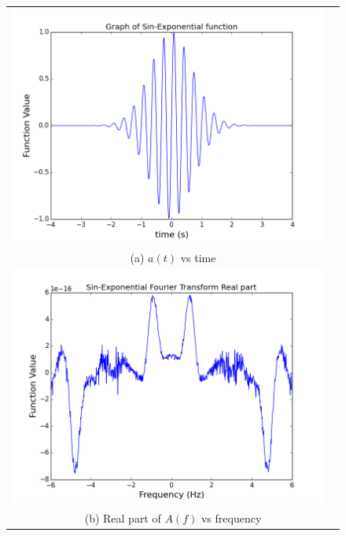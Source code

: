 \documentclass[11pt]{article}
\begin{document}
\begin{figure}[ht]
\centering
\begin{tabular}{cc}
\includegraphics[scale=.4]{sin_wavepacket.png} \\
\multicolumn{2}{c}{(a) $a(t)$ vs time} \\[6pt]

\includegraphics[scale=.4]{sin_fourReal.png}\\
\multicolumn{2}{c}{(b) Real part of $A(f)$ vs frequency} \\[6pt]


\end{tabular}
\end{figure}
\end{document}

